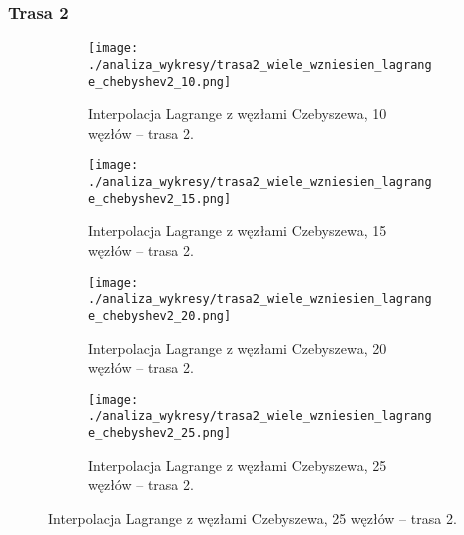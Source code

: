 \documentclass[a4paper,12pt]{article}
\begin{document}
\subsubsection{Trasa 2}
\begin{figure}[H]
    \centering
    \begin{subfigure}{0.45\textwidth}
        \centering
        \texttt{[image: ./analiza\_wykresy/trasa2\_wiele\_wzniesien\_lagrange\_chebyshev2\_10.png]}
        \caption{Interpolacja Lagrange z węzłami Czebyszewa, 10 węzłów – trasa 2.}
    \end{subfigure}\hfill
    \begin{subfigure}{0.45\textwidth}
        \centering
        \texttt{[image: ./analiza\_wykresy/trasa2\_wiele\_wzniesien\_lagrange\_chebyshev2\_15.png]}
        \caption{Interpolacja Lagrange z węzłami Czebyszewa, 15 węzłów – trasa 2.}
    \end{subfigure}
    
    \vspace{0.5cm}
    
    \begin{subfigure}{0.45\textwidth}
        \centering
        \texttt{[image: ./analiza\_wykresy/trasa2\_wiele\_wzniesien\_lagrange\_chebyshev2\_20.png]}
        \caption{Interpolacja Lagrange z węzłami Czebyszewa, 20 węzłów – trasa 2.}
    \end{subfigure}\hfill
    \begin{subfigure}{0.45\textwidth}
        \centering
        \texttt{[image: ./analiza\_wykresy/trasa2\_wiele\_wzniesien\_lagrange\_chebyshev2\_25.png]}
        \caption{Interpolacja Lagrange z węzłami Czebyszewa, 25 węzłów – trasa 2.}
    \end{subfigure}
\end{figure}
\end{document}
